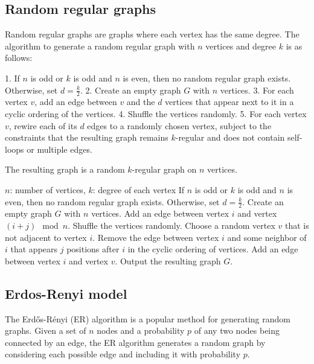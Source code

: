 \subsection{Random regular graphs}

Random regular graphs are graphs where each vertex has the same degree. The algorithm to generate a random regular graph with $n$ vertices and degree $k$ is as follows:

1. If $n$ is odd or $k$ is odd and $n$ is even, then no random regular graph exists. Otherwise, set $d = \frac{k}{2}$.
2. Create an empty graph $G$ with $n$ vertices.
3. For each vertex $v$, add an edge between $v$ and the $d$ vertices that appear next to it in a cyclic ordering of the vertices.
4. Shuffle the vertices randomly.
5. For each vertex $v$, rewire each of its $d$ edges to a randomly chosen vertex, subject to the constraints that the resulting graph remains $k$-regular and does not contain self-loops or multiple edges.

The resulting graph is a random $k$-regular graph on $n$ vertices.

\begin{algorithmic}[1]
\Require $n$: number of vertices, $k$: degree of each vertex
\State If $n$ is odd or $k$ is odd and $n$ is even, then no random regular graph exists.
\State Otherwise, set $d = \frac{k}{2}$.
\State Create an empty graph $G$ with $n$ vertices.
        \State Add an edge between vertex $i$ and vertex $(i+j) \mod n$.
    \EndFor
\EndFor
\State Shuffle the vertices randomly.
        \State Choose a random vertex $v$ that is not adjacent to vertex $i$.
        \State Remove the edge between vertex $i$ and some neighbor of $i$ that appears $j$ positions after $i$ in the cyclic ordering of vertices.
        \State Add an edge between vertex $i$ and vertex $v$.
    \EndFor
\EndFor
\State Output the resulting graph $G$.
\end{algorithmic}

\subsection{Erdos-Renyi model}
The Erdős-Rényi (ER) algorithm is a popular method for generating random graphs. Given a set of $n$ nodes and a probability $p$ of any two nodes being connected by an edge, the ER algorithm generates a random graph by considering each possible edge and including it with probability $p$.

